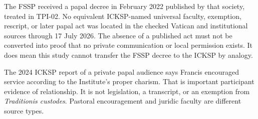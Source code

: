 The FSSP received a papal decree in February 2022 published by that society, treated in TPI-02. No equivalent ICKSP-named universal faculty, exemption, rescript, or later papal act was located in the checked Vatican and institutional sources through 17 July 2026. The absence of a published act must not be converted into proof that no private communication or local permission exists. It does mean this study cannot transfer the FSSP decree to the ICKSP by analogy.

The 2024 ICKSP report of a private papal audience says Francis encouraged service according to the Institute's proper charism. That is important participant evidence of relationship. It is not legislation, a transcript, or an exemption from \emph{Traditionis custodes}. Pastoral encouragement and juridic faculty are different source types.

